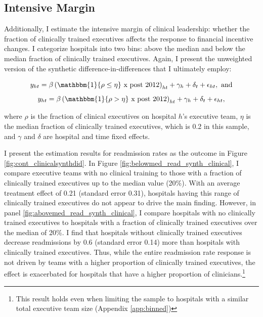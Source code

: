 \documentclass[12pt]{article}
\begin{document}
    \subsection{Intensive Margin}

    Additionally, I estimate the intensive margin of clinical leadership: whether the fraction of clinically trained executives affects the response to financial incentive changes. I categorize hospitals into two bins: above the median and below the median fraction of clinically trained executives. Again, I present the unweighted version of the synthetic difference-in-differences that I ultimately employ:

    \begin{equation}
    \label{eq:clinical_continuous_onefourth}
    y_{ht} = \beta \left(\mathbbm{1}\{\rho \leq \eta\}\text{ x post 2012}\right)_{ht} + \gamma_{h} + \delta_t + \epsilon_{ht}, \text{ and}
    \end{equation}
    \begin{equation}
    \label{eq:clinical_continuous_onehalf}
    y_{ht} = \beta \left(\mathbbm{1}\{\rho > \eta\}\text{ x post 2012}\right)_{ht} + \gamma_{h} + \delta_t + \epsilon_{ht},
    \end{equation}

    \noindent where $\rho$ is the fraction of clinical executives on hospital $h$'s executive team, $\eta$ is the median fraction of clinically trained executives, which is 0.2 in this sample, and $\gamma$ and $\delta$ are hospital and time fixed effects. 

    I present the estimation results for readmission rates as the outcome in Figure \ref{fig:cont_clinicalsynthdid}. In Figure \ref{fig:belowmed_read_synth_clinical}, I compare executive teams with no clinical training to those with a fraction of clinically trained executives up to the median value (20\%). With an average treatment effect of 0.21 (standard error 0.31), hospitals having this range of clinically trained executives do not appear to drive the main finding. However, in panel \ref{fig:abovemed_read_synth_clinical}, I compare hospitals with no clinically trained executives to hospitals with a fraction of clinically trained executives over the median of 20\%. I find that hospitals without clinically trained executives decrease readmissions by 0.6 (standard error 0.14) more than hospitals with clinically trained executives. Thus, while the entire readmission rate response is not driven by teams with a higher proportion of clinically trained executives, the effect is exacerbated for hospitals that have a higher proportion of clinicians.\footnote{This result holds even when limiting the sample to hospitals with a similar total executive team size (Appendix \ref{app:binned})}
\end{document}
